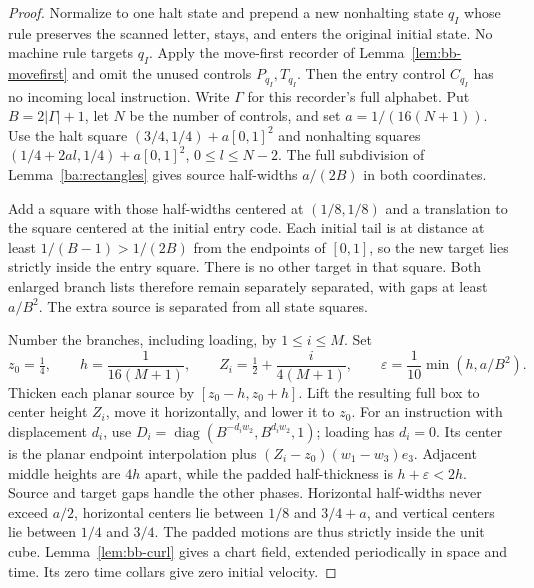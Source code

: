\begin{proof}\label{ba:periodic-torus-proof}
Normalize to one halt state and prepend a new nonhalting state $q_I$
whose rule preserves the scanned letter, stays, and enters the original
initial state.  No machine rule targets $q_I$.  Apply the move-first
recorder of Lemma~\ref{lem:bb-movefirst} and omit the unused controls
$P_{q_I},T_{q_I}$. Then the entry control $C_{q_I}$ has no incoming local
instruction.  Write $\Gamma$
for this recorder's full alphabet.  Put $B=2|\Gamma|+1$, let $N$
be the number of controls, and set
$a=1/(16(N+1))$.  Use the halt square
$(3/4,1/4)+a[0,1]^2$ and nonhalting squares
$(1/4+2al,1/4)+a[0,1]^2$, $0\le l\le N-2$.
The full subdivision of Lemma~\ref{ba:rectangles} gives source
half-widths $a/(2B)$ in both coordinates.

Add a square with those half-widths centered at $(1/8,1/8)$ and a
translation to the square centered at the initial entry code.  Each
initial tail is at distance at least $1/(B-1)>1/(2B)$ from the endpoints
of $[0,1]$, so the new target lies strictly inside the entry square.
There is no other target in that square.  Both enlarged branch lists
therefore remain separately separated, with gaps at least $a/B^2$.
The extra source is separated from all state squares.

Number the branches, including loading, by $1\le i\le M$.  Set
\[
 z_0=\tfrac14,\qquad h=\frac1{16(M+1)},\qquad
 Z_i=\tfrac12+\frac{i}{4(M+1)},\qquad
 \varepsilon=\frac1{10}\min(h,a/B^2).
\]
Thicken each planar source by $[z_0-h,z_0+h]$.  Lift the resulting
full box to center height $Z_i$, move it horizontally, and lower it
to $z_0$.  For an instruction with displacement $d_i$, use
$D_i=\operatorname{diag}(B^{-d_iw_2},B^{d_iw_2},1)$;
loading has $d_i=0$.  Its center is the planar endpoint interpolation
plus $(Z_i-z_0)(w_1-w_3)e_3$.  Adjacent middle heights are $4h$ apart,
while the padded half-thickness is $h+\varepsilon<2h$.
Source and target gaps handle the other phases.  Horizontal half-widths
never exceed $a/2$, horizontal centers lie between $1/8$ and $3/4+a$,
and vertical centers lie between $1/4$ and $3/4$.  The padded motions
are thus strictly inside the unit cube.  Lemma~\ref{lem:bb-curl} gives a
chart field, extended periodically in space and time.  Its zero time
collars give zero initial velocity.


\end{proof}
